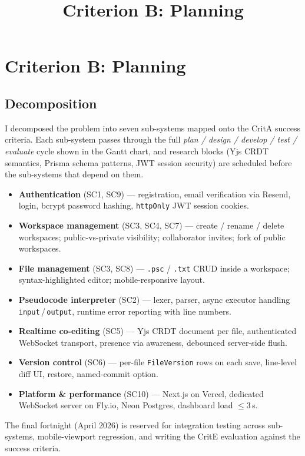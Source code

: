 \documentclass[11pt,a4paper]{article}
\title{Criterion B: Planning}
\author{}
\date{}
\begin{document}
\section*{Criterion B: Planning}

\subsection*{Decomposition}

I decomposed the problem into seven sub-systems mapped onto the CritA success criteria. Each sub-system passes through the full \emph{plan / design / develop / test / evaluate} cycle shown in the Gantt chart, and research blocks (Yjs CRDT semantics, Prisma schema patterns, JWT session security) are scheduled before the sub-systems that depend on them.

\begin{itemize}
  \item \textbf{Authentication} (SC1, SC9) --- registration, email verification via Resend, login, bcrypt password hashing, \texttt{httpOnly} JWT session cookies.
  \item \textbf{Workspace management} (SC3, SC4, SC7) --- create / rename / delete workspaces; public-vs-private visibility; collaborator invites; fork of public workspaces.
  \item \textbf{File management} (SC3, SC8) --- \texttt{.psc} / \texttt{.txt} CRUD inside a workspace; syntax-highlighted editor; mobile-responsive layout.
  \item \textbf{Pseudocode interpreter} (SC2) --- lexer, parser, async executor handling \texttt{input}\,/\,\texttt{output}, runtime error reporting with line numbers.
  \item \textbf{Realtime co-editing} (SC5) --- Yjs CRDT document per file, authenticated WebSocket transport, presence via awareness, debounced server-side flush.
  \item \textbf{Version control} (SC6) --- per-file \texttt{FileVersion} rows on each save, line-level diff UI, restore, named-commit option.
  \item \textbf{Platform \& performance} (SC10) --- Next.js on Vercel, dedicated WebSocket server on Fly.io, Neon Postgres, dashboard load $\leq 3$\,s.
\end{itemize}

The final fortnight (April 2026) is reserved for integration testing across sub-systems, mobile-viewport regression, and writing the CritE evaluation against the success criteria.
\end{document}
